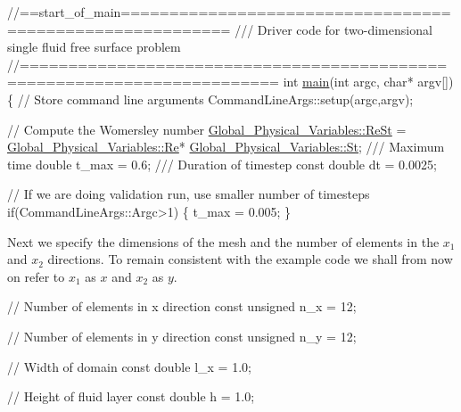 \begin{DoxyCodeInclude}
\textcolor{comment}{//==start\_of\_main=========================================================}
\textcolor{comment}{/// Driver code for two-dimensional single fluid free surface problem}
\textcolor{comment}{}\textcolor{comment}{//========================================================================}
\textcolor{keywordtype}{int} \hyperlink{elastic__single__layer_8cc_a0ddf1224851353fc92bfbff6f499fa97}{main}(\textcolor{keywordtype}{int} argc, \textcolor{keywordtype}{char}* argv[]) 
\{
 \textcolor{comment}{// Store command line arguments}
 CommandLineArgs::setup(argc,argv);

 \textcolor{comment}{// Compute the Womersley number}
 \hyperlink{namespaceGlobal__Physical__Variables_a085ee4bf968ffdd01a41b8c41864f907}{Global\_Physical\_Variables::ReSt} =
  \hyperlink{namespaceGlobal__Physical__Variables_ab814e627d2eb5bc50318879d19ab16b9}{Global\_Physical\_Variables::Re}*
      \hyperlink{namespaceGlobal__Physical__Variables_a4b6ef72bd221361c37f5b9a4a6899afc}{Global\_Physical\_Variables::St};
\textcolor{comment}{}
\textcolor{comment}{ /// Maximum time}
\textcolor{comment}{} \textcolor{keywordtype}{double} t\_max = 0.6;
\textcolor{comment}{}
\textcolor{comment}{ /// Duration of timestep}
\textcolor{comment}{} \textcolor{keyword}{const} \textcolor{keywordtype}{double} dt = 0.0025;

 \textcolor{comment}{// If we are doing validation run, use smaller number of timesteps}
 \textcolor{keywordflow}{if}(CommandLineArgs::Argc>1) \{ t\_max = 0.005; \}

\end{DoxyCodeInclude}


Next we specify the dimensions of the mesh and the number of elements in the $ x_1 $ and $ x_2 $ directions. To remain consistent with the example code we shall from now on refer to $ x_1 $ as $ x $ and $ x_2 $ as $ y $.


\begin{DoxyCodeInclude}
 \textcolor{comment}{// Number of elements in x direction}
 \textcolor{keyword}{const} \textcolor{keywordtype}{unsigned} n\_x = 12;
   
 \textcolor{comment}{// Number of elements in y direction}
 \textcolor{keyword}{const} \textcolor{keywordtype}{unsigned} n\_y = 12;

 \textcolor{comment}{// Width of domain}
 \textcolor{keyword}{const} \textcolor{keywordtype}{double} l\_x = 1.0;

 \textcolor{comment}{// Height of fluid layer}
 \textcolor{keyword}{const} \textcolor{keywordtype}{double} h = 1.0;

\end{DoxyCodeInclude}


